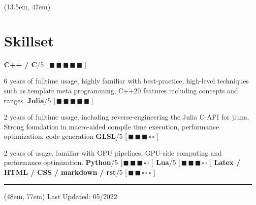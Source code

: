 \documentclass[20pt]{article}
\begin{document}
    \begin{textblock*}{45em}(13.5em, 47em)
        {\section*{\fontsize{15}{15}\selectfont Skillset}}

        \newcommand\skillone[1]{{\noindent \fontsize{14}{14}\selectfont\textbf{#1}}{\hfill\fontsize{13}{13}\selectfont 1/5 \color{swingy_pink}[\color{mint}$\,\blacksquare\,\square\,\square\,\square\,\square$ \color{swingy_pink}]}\newline}
        \newcommand\skilltwo[1]{{\noindent \fontsize{14}{14}\selectfont\textbf{#1}}{\hfill\fontsize{13}{13}\selectfont 2/5 \color{swingy_pink}[\color{mint}$\,\blacksquare\,\blacksquare\,\square\,\square\,\square$ \color{swingy_pink}]}\newline}
        \newcommand\skillthree[1]{{\noindent \fontsize{14}{14}\selectfont\textbf{#1}}{\hfill\fontsize{13}{13}\selectfont 3/5 \color{swingy_pink}[\color{mint}$\,\blacksquare\,\blacksquare\,\blacksquare\,\square\,\square$ \color{swingy_pink}]}\newline}
        \newcommand\skillfour[1]{{\noindent \fontsize{14}{14}\selectfont\textbf{#1}}{\hfill\fontsize{13}{13}\selectfont 4/5 \color{swingy_pink}[\color{mint}$\,\blacksquare\,\blacksquare\,\blacksquare\,\blacksquare\,\square$ \color{swingy_pink}]}\newline}
        \newcommand\skillfive[1]{{\noindent \fontsize{14}{14}\selectfont\textbf{#1}}{\hfill\fontsize{13}{13}\selectfont 5/5 \color{swingy_pink}[\color{mint}$\,\blacksquare\,\blacksquare\,\blacksquare\,\blacksquare\,\blacksquare$ \color{swingy_pink}]}\newline}

        \flushleft
        \fontsize{11}{11}\selectfont

        \skillfive{C++ / C}

        6 years of fulltime usage, highly familiar with best-practice, high-level techniques such as
        template meta programming, C++20 features including concepts and ranges.
        \newline\linebreak
        \skillfive{Julia}

        2 years of fulltime usage, including reverse-engineering the Julia C-API for jluna. Strong foundation
        in macro-aided compile time execution, performance optimization, code generation
        \newline\linebreak
        \skillthree{GLSL}

        2 years of usage, familiar with GPU pipelines, GPU-side computing and performance optimization.
        \newline\linebreak
        \skillthree{Python}
        \skillthree{Lua}
        \skilltwo{Latex / HTML / CSS / markdown / rst}
        \vspace{5em}
        {\color{swingy_pink}\rule{\linewidth}{1.5pt}}

    \end{textblock*}

    \begin{textblock*}{\textwidth}(48em, 77em)
        \fontsize{10}{10}\selectfont \color{gray} Last Updated: 05/2022
    \end{textblock*}
\end{document}
